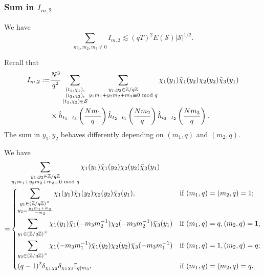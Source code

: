 \subsubsection{Sum in $I_{m,2}$}
\begin{proposition}  \label{im2bound}
    We have \[
    \sum_{m_1,m_2,m_3\neq 0} I_{m,2}\lesssim (qT)^2E(\mathcal{S})|\mathcal{S}|^{1/2}.
    \]
\end{proposition}
Recall that
\begin{align*}I_{m,2}\mathrel{\mathop:}=&\frac{N^3}{q^2}\sum_{\substack{(t_1,\chi_1),\\(t_2,\chi_2),\\(t_3,\chi_3)\in\mathcal{S}}} \sum_{\substack{y_1,y_2 \in\mathbb{Z}/q\mathbb{Z} \\ y_1m_1+y_2m_2+m_3\equiv 0 \textrm{ mod } q}}\chi_1(y_1)\bar{\chi}_1(y_2)\chi_2(y_2)\bar{\chi}_3(y_1)\\
    &\times \hat{h}_{t_1-t_3}\left(\frac{Nm_1}{q}\right)\hat{h}_{t_2-t_1}\left(\frac{Nm_2}{q}\right)\hat{h}_{t_3-t_2}\left(\frac{Nm_3}{q}\right).
    \end{align*}
The sum in $y_1,y_2$ behaves differently depending on $(m_1, q)$ and $(m_2, q)$.
\begin{proposition}
    We have
    \begin{align*}
        &\sum_{\substack{y_1,y_2 \in\mathbb{Z}/q\mathbb{Z} \\ y_1m_1+y_2m_2+m_3\equiv 0 \mod q}}\chi_1(y_1)\bar{\chi}_1(y_2)\chi_2(y_2)\bar{\chi}_3(y_1)\\=&
        \begin{dcases*}
            \sum_{\substack{y_1\in (\mathbb{Z}/q\mathbb{Z})^\times\\y_2=\frac{y_1m_1+m_3}{-m_2}}}\chi_1(y_1)\bar{\chi}_1(y_2)\chi_2(y_2)\bar{\chi}_3(y_1), &if $(m_1,q)=(m_2,q)=1$;\\
            \sum_{\substack{y_1\in (\mathbb{Z}/q\mathbb{Z})^\times}}\chi_1(y_1)\bar{\chi}_1(-m_3m_2^{-1})\chi_2(-m_3m_2^{-1})\bar{\chi}_3(y_1)& if $(m_1,q)=q, (m_2,q)=1$;\\
            \sum_{\substack{y_2\in (\mathbb{Z}/q\mathbb{Z})^\times}}\chi_1(-m_3m_1^{-1})\bar{\chi}_1(y_2)\chi_2(y_2)\bar{\chi}_3(-m_3m_1^{-1})& if $(m_1,q)=1,(m_2,q)=q$;\\
            (q-1)^2\delta_{\chi_1\chi_2}\delta_{\chi_1\chi_3}\mathbb{I}_{q|m_3}, & if $ (m_1,q)=(m_2,q)=q.$\\
        \end{dcases*}
    \end{align*}
\end{proposition} 
